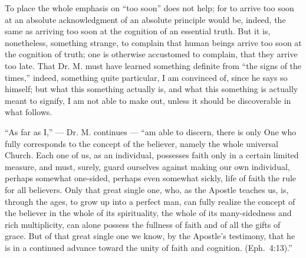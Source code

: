 \documentclass[12pt]{book}
\begin{document}
To place the whole emphasis on ``too soon'' does not help; for to arrive too soon at an absolute acknowledgment of an absolute principle would be, indeed, the same as arriving too soon at the cognition of an essential truth. But it is, nonetheless, something strange, to complain that human beings arrive too soon at the cognition of truth; one is otherwise accustomed to complain, that they arrive too late. That Dr. M. must have learned something definite from ``the signs of the times,'' indeed, something quite particular, I am convinced of, since he says so himself; but what this something actually is, and what this something is actually meant to signify, I am not able to make out, unless it should be discoverable in what follows.

``As far as I,'' --- Dr. M. continues --- ``am able to discern, there is only One who fully corresponds to the concept of the believer, namely the whole universal Church. Each one of us, as an individual, possesses faith only in a certain limited measure, and must, surely, guard ourselves against making our own individual, perhaps somewhat one-sided, perhaps even somewhat sickly, life of faith the rule for all believers. Only that great single one, who, as the Apostle teaches us, is, through the ages, to grow up into a perfect man, can fully realize the concept of the believer in the whole of its spirituality, the whole of its many-sidedness and rich multiplicity, can alone possess the fullness of faith and of all the gifts of grace. But of that great single one we know, by the Apostle's testimony, that he is in a continued advance toward the unity of faith and cognition. (Eph.\ 4:13).''
\end{document}
